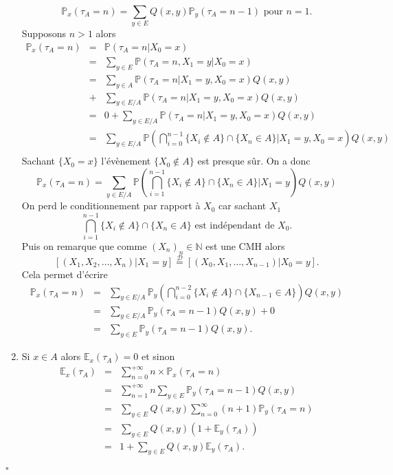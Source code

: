 \documentclass[8pt,notheorems]{beamer}
\def \E{\mathbb E}
\def \N{\mathbb N}
\def \P {\mathbb P}
\renewcommand{\Pr}{\mathbb{P}}
\theoremstyle{definition}
\theoremstyle{example}
\theoremstyle{mystyle}
\theoremstyle{plain}
\begin{document}
\begin{frame}[allowframebreaks]
\begin{enumerate}
$$    \Pr_x(\tau_A=n)=\sum_{y\in E}Q(x,y)\Pr_y(\tau_A=n-1)\text{ pour }n = 1.
    $$
    Supposons $n>1$ alors
    \begin{eqnarray*}
    \P_x(\tau_A=n)&=&\P(\tau_A=n|X_0=x)\\
    &=&\sum_{y\in E} \P(\tau_A=n, X_1=y|X_0=x)\\
    &=&\sum_{y\in A} \P(\tau_A=n |X_1=y,X_0=x)Q(x,y) \\
    &+& \sum_{y\in E/A} \P(\tau_A=n|X_1=y,X_0=x)Q(x,y)\\
    &=& 0+ \sum_{y\in E/A} \P(\tau_A=n|X_1=y,X_0=x)Q(x,y)\\
    &=&  \sum_{y\in E/A} \P\left(\bigcap_{i = 0}^{n-1}\{X_i\notin A\}\cap\{X_n\in A\}|X_1=y,X_0=x\right)Q(x,y)\\
    \end{eqnarray*}
    Sachant $\{X_0 = x\}$ l'évènement $\{X_0 \notin A\}$ est presque sûr. On a donc
     $$
     \P_x(\tau_A=n)=  \sum_{y\in E/A} \P\left(\bigcap_{i = 1}^{n-1}\{X_i\notin A\}\cap\{X_n\in A\}|X_1=y\right)Q(x,y)
     $$
     On perd le conditionnement par rapport à $X_0$ car sachant $X_1$
     $$
     \bigcap_{i = 1}^{n-1}\{X_i\notin A\}\cap\{X_n\in A\}\text{ est indépendant de } X_0.
     $$
     Puis on remarque que comme $(X_n)_n\in \N$ est une CMH alors
     $$
     [(X_1, X_2,\ldots, X_n)|X_1  =y]\overset{\mathcal{D}}{=}[(X_0, X_1,\ldots, X_{n-1})|X_0 = y].
     $$
     Cela permet d'écrire
    \begin{eqnarray*}
    \P_x(\tau_A=n)&=&\sum_{y\in E/A} \P_y\left(\bigcap_{i = 0}^{n-2}\{X_i\notin A\}\cap\{X_{n-1}\in A\}\right)Q(x,y)\\
    &=&\sum_{y\in E/A} \P_y\left(\tau_A = n-1\right)Q(x,y) + 0\\
    &=&\sum_{y\in E} \P_y\left(\tau_A = n-1\right)Q(x,y).
    \end{eqnarray*}
    \item Si $x\in A$ alors $\E_x(\tau_A)=0$ et sinon
\begin{eqnarray*}
\E_x(\tau_A)&=&\sum_{n=0}^{+\infty}n\times\P_x(\tau_A=n)\\
&=&\sum_{n=1}^{+\infty}n\sum_{y\in E}\P_y(\tau_A=n-1)Q(x,y)\\
&=&\sum_{y\in E}Q(x,y)\sum_{n=0}^{\infty}(n+1)\P_y(\tau_A=n)\\
&=&\sum_{y\in E}Q(x,y)(1+ \E_y(\tau_A))\\
&=&1+\sum_{y\in E}Q(x,y)\E_y(\tau_A).
\end{eqnarray*}

\end{enumerate}
$\square$
\end{frame}
\end{document}
